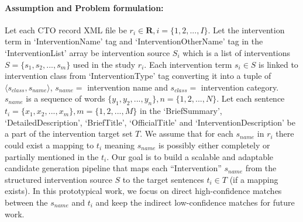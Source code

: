 \documentclass[letterpaper]{article} %
\begin{document}
\paragraph{Assumption and Problem formulation: }
Let each CTO record XML file be $r_i \in \boldsymbol{R}, i = \{ 1, 2, ... , I \}$.
Let the intervention term in `InterventionName' tag and `InterventionOtherName' tag in the `InterventionList' array be intervention source $S_i$ which is a list of interventions $S = \{ s_1, s_2, ... , s_m \}$ used in the study $r_i$.
Each intervention term $s_i \in S$ is linked to intervention class from `InterventionType' tag converting it into a tuple of $ \langle s_{class}, s_{name} \rangle$, $s_{name} =$ intervention name and $s_{class} =$ intervention category.
$s_{name}$ is a sequence of words $\{ y_1, y_2, ... , y_n \}, n = \{ 1, 2, ... , N \} $.
Let each sentence $t_i = \{ x_1, x_2, ... , x_m \}, m = \{ 1, 2, ... , M \}$ in the `BriefSummary', `DetailedDescription', `BriefTitle', `OfficialTitle' and `InterventionDescription' be a part of the intervention target set $T$.
We assume that for each $s_{name}$ in $r_i$ there could exist a mapping to $t_i$ meaning $s_{name}$ is possibly either completely or partially mentioned in the $t_i$.
Our goal is to build a scalable and adaptable candidate generation pipeline that maps each ``Intervention'' $s_{name}$ from the structured intervention source $S$ to the target sentences $t_i \in T$ (if a mapping exists).
In this prototypical work, we focus on direct high-confidence matches between the $s_{name}$ and $t_i$ and keep the indirect low-confidence matches for future work.
%
\end{document}
